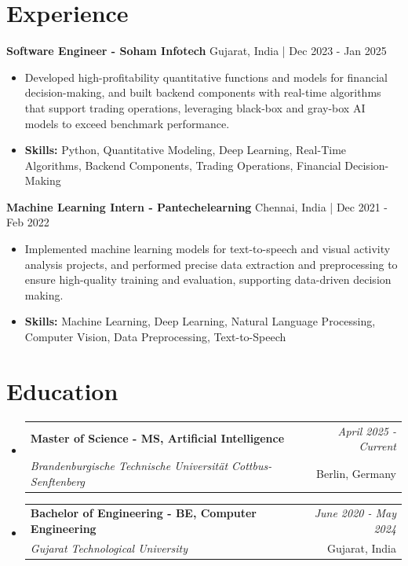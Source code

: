 \documentclass[a4paper,11pt]{article}
\makeatletter
\newcommand{\resumeSubheading}[4]{
\vspace{0.5mm}\item
    \begin{tabular*}{\linewidth}[t]{l@{\extracolsep{\fill}}r}
        \textbf{#1} & \textit{\footnotesize{#4}} \\
        \textit{\footnotesize{#3}} &  \footnotesize{#2}\\
    \end{tabular*}
    \vspace{-2.4mm}
}
\makeatother
\begin{document}
\section{\textbf{Experience}}


\vspace{1mm}
  \textbf{Software Engineer - Soham Infotech} \hfill Gujarat, India | Dec 2023 - Jan 2025
\vspace{-1.5mm} %
\begin{itemize}
  \item Developed high-profitability quantitative functions and models for financial decision-making, and built backend components with real-time algorithms that support trading operations, leveraging black-box and gray-box AI models to exceed benchmark performance.

\vspace{-2mm}
  \item \textbf{Skills:} Python, Quantitative Modeling, Deep Learning, Real-Time Algorithms, Backend Components, Trading Operations, Financial Decision-Making
\end{itemize}

\vspace{1mm}
  \textbf{Machine Learning Intern - Pantechelearning} \hfill Chennai, India | Dec 2021 - Feb 2022
\vspace{-1.5mm} %
\begin{itemize}
  \item Implemented machine learning models for text-to-speech and visual activity analysis projects, and performed precise data extraction and preprocessing to ensure high-quality training and evaluation, supporting data-driven decision making.
\vspace{-2mm}
  \item \textbf{Skills:} Machine Learning, Deep Learning, Natural Language Processing, Computer Vision, Data Preprocessing, Text-to-Speech
\end{itemize}\section{\textbf{Education}}
\vspace{-0.4mm}

\begin{itemize}[leftmargin=0.15in, label={}]
\resumeSubheading
{Master of Science - MS, Artificial Intelligence }{Berlin, Germany}
{Brandenburgische Technische Universität Cottbus-Senftenberg  }{April 2025 - Current}

\vspace{1.0mm} %
\resumeSubheading
{Bachelor of Engineering - BE, Computer Engineering  }{Gujarat, India}
{Gujarat Technological University }{June 2020 - May 2024}

\end{itemize}
\end{document}
